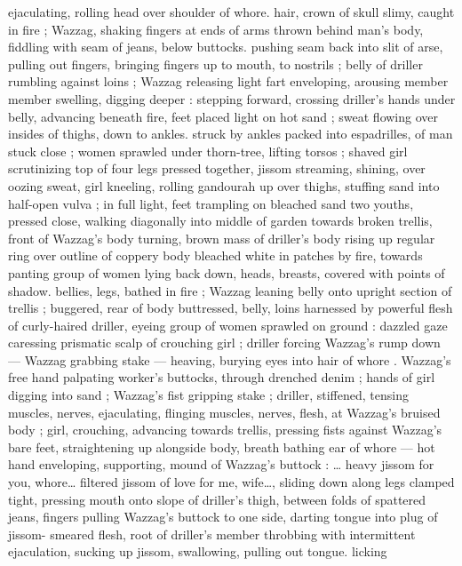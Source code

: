 ejaculating, rolling head over shoulder of whore. hair, crown of skull 
slimy, caught in fire ; Wazzag, shaking fingers at ends of arms thrown 
behind man's body, fiddling with seam of jeans, below buttocks. 
pushing seam back into slit of arse, pulling out fingers, bringing 
fingers up to mouth, to nostrils ; belly of driller rumbling against 
loins ; Wazzag releasing light fart enveloping, arousing member 
member swelling, digging deeper : stepping forward, crossing 
driller's hands under belly, advancing beneath fire, feet placed light 
on hot sand ; sweat flowing over insides of thighs, down to ankles. 
struck by ankles packed into espadrilles, of man stuck close ; women 
sprawled under thorn-tree, lifting torsos ; shaved girl scrutinizing top 
of four legs pressed together, jissom streaming, shining, over oozing 
sweat, girl kneeling, rolling gandourah up over thighs, stuffing sand 
into half-open vulva ; in full light, feet trampling on bleached sand 
two youths, pressed close, walking diagonally into middle of garden 
towards broken trellis, front of Wazzag's body turning, brown mass 
of driller's body rising up regular ring over outline of coppery body 
bleached white in patches by fire, towards panting group of women 
lying back down, heads, breasts, covered with points of shadow. 
bellies, legs, bathed in fire ; Wazzag leaning belly onto upright 
section of trellis ; buggered, rear of body buttressed, belly, loins 
harnessed by powerful flesh of curly-haired driller, eyeing group of 
women sprawled on ground : dazzled gaze caressing prismatic scalp 
of crouching girl ; driller forcing Wazzag's rump down --- Wazzag 
grabbing stake --- heaving, burying eyes into hair of whore . 
Wazzag's free hand palpating worker's buttocks, through drenched 
denim ; hands of girl digging into sand ; Wazzag's fist gripping stake 
; driller, stiffened, tensing muscles, nerves, ejaculating, flinging 
muscles, nerves, flesh, at Wazzag's bruised body ; girl, crouching, 
advancing towards trellis, pressing fists against Wazzag's bare feet, 
straightening up alongside body, breath bathing ear of whore --- hot 
hand enveloping, supporting, mound of Wazzag's buttock : {\gl}{\ldots} heavy 
jissom for you, whore{\ldots} filtered jissom of love for me, wife{\ldots}{\gr}, sliding 
down along legs clamped tight, pressing mouth onto slope of 
driller's thigh, between folds of spattered jeans, fingers pulling 
Wazzag's buttock to one side, darting tongue into plug of jissom- 
smeared flesh, root of driller's member throbbing with intermittent 
ejaculation, sucking up jissom, swallowing, pulling out tongue. licking 
